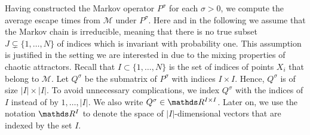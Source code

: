 Having constructed the Markov operator $P^\sigma$ for each $\sigma>0$, we compute the average escape times from $\mathcal{M}$ under $P^\sigma$. Here and in the following we assume that the Markov chain is irreducible, meaning that there is no true subset $J \subsetneq \{1,\ldots,N\}$ of indices which is invariant with probability one.
This assumption is justified in the setting we are interested in due to the mixing properties of chaotic attractors.
Recall that $I \subset \{1,\hdots, N\}$ is the set of indices of points $X_i$ that belong to $\mathcal{M}$. Let $Q^\sigma$ be the submatrix of $P^\sigma$ with indices $I\times I$. Hence, $Q^\sigma$ is of size $|I|\times |I|$. To avoid unnecessary complications, we index $Q^\sigma$ with the indices of $I$ instead of by $1, \hdots, |I|$. We also write $Q^\sigma \in \R^{I\times I}$. Later on, we use the notation $\R^I$ to denote the space of $|I|$-dimensional vectors that are indexed by the set $I$.

